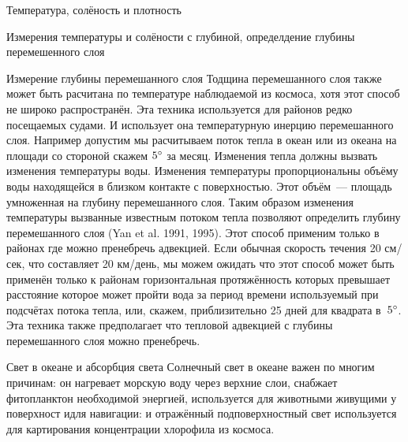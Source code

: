 \begin{chapter}{Температура, солёность и плотность}
\begin{section}{Измерения температуры и солёности с глубиной, определдение глубины перемешенного слоя}
\begin{paragraph}{Измерение глубины перемешанного слоя}
Тодщина перемешанного слоя также может быть расчитана по температуре
наблюдаемой из космоса, хотя этот способ не широко распространён. Эта
техника используется для районов редко посещаемых судами. И использует
она температурную инерцию перемешанного слоя. Например допустим мы
расчитываем поток тепла в океан или из океана на площади со стороной
скажем ${5}^\circ$ за месяц. Изменения тепла должны вызвать
изменения температуры воды. Изменения температуры пропорциональны
объёму воды находящейся в близком контакте с поверхностью. Этот
объём~--- площадь умноженная на глубину перемешанного слоя. Таким
образом изменения температуры вызванные известным потоком тепла
позволяют определить глубину перемешанного слоя (Yan et al. 1991,
1995). Этот способ применим только в районах где можно пренебречь
адвекцией. Если обычная скорость течения 20 см/сек, что составляет 20
км/день, мы можем ожидать что этот способ может быть применён только к
районам горизонтальная протяжённость которых превышает расстояние
которое может пройти вода за период времени используемый при подсчётах
потока тепла, или, скажем, приблизительно 25 дней для квадрата
в~${5}^\circ$. Эта техника также предполагает что тепловой адвекцией
с глубины перемешанного слоя можно пренебречь.
\end{paragraph}
\end{section}

\begin{section}{Свет в океане и абсорбция света}
Солнечный свет в океане важен по многим причинам: он нагревает морскую
воду через верхние слои, снабжает фитопланктон необходимой энергией,
используется для животными живущими у поверхност идля навигации: и
отражённый подповерхностный свет используется для картирования
концентрации хлорофила из космоса.
%



\end{section}
\end{chapter}
